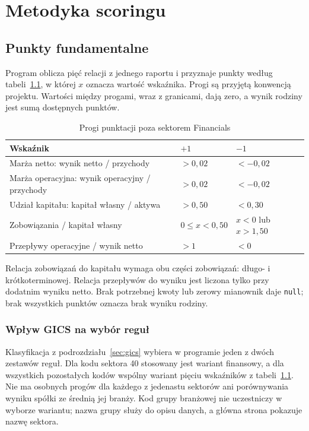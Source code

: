 \documentclass[12pt,a4paper,twoside]{report}
\begin{document}

\cleardoublepage
\chapter{Metodyka scoringu}
\label{chap:scoring}

\section{Punkty fundamentalne}

Program oblicza pięć relacji z jednego raportu i przyznaje punkty według tabeli~\ref{tab:thresholds}, w której $x$ oznacza wartość wskaźnika. Progi są przyjętą konwencją projektu. Wartości między progami, wraz z granicami, dają zero, a wynik rodziny jest sumą dostępnych punktów.

\begin{table}[htbp]
\centering
\caption{Progi punktacji poza sektorem Financials}
\label{tab:thresholds}
\small
\begin{tabularx}{\textwidth}{Xp{3cm}p{3cm}}
\toprule
Wskaźnik & $+1$ & $-1$ \\
\midrule
Marża netto: wynik netto / przychody & $>0{,}02$ & $<-0{,}02$ \\
Marża operacyjna: wynik operacyjny / przychody & $>0{,}02$ & $<-0{,}02$ \\
Udział kapitału: kapitał własny / aktywa & $>0{,}50$ & $<0{,}30$ \\
Zobowiązania / kapitał własny & $0\leq x<0{,}50$ & $x<0$ lub $x>1{,}50$ \\
Przepływy operacyjne / wynik netto & $>1$ & $<0$ \\
\bottomrule
\end{tabularx}
\end{table}

Relacja zobowiązań do kapitału wymaga obu części zobowiązań: długo- i krótkoterminowej. Relacja przepływów do wyniku jest liczona tylko przy dodatnim wyniku netto. Brak potrzebnej kwoty lub zerowy mianownik daje \texttt{null}; brak wszystkich punktów oznacza brak wyniku rodziny.

\subsection{Wpływ GICS na wybór reguł}
\label{sec:gics-scoring}

Klasyfikacja z podrozdziału~\ref{sec:gics} wybiera w programie jeden z dwóch zestawów reguł. Dla kodu sektora 40 stosowany jest wariant finansowy, a dla wszystkich pozostałych kodów wspólny wariant pięciu wskaźników z tabeli~\ref{tab:thresholds}. Nie ma osobnych progów dla każdego z jedenastu sektorów ani porównywania wyniku spółki ze średnią jej branży. Kod grupy branżowej nie uczestniczy w wyborze wariantu; nazwa grupy służy do opisu danych, a główna strona pokazuje nazwę sektora.
\end{document}
